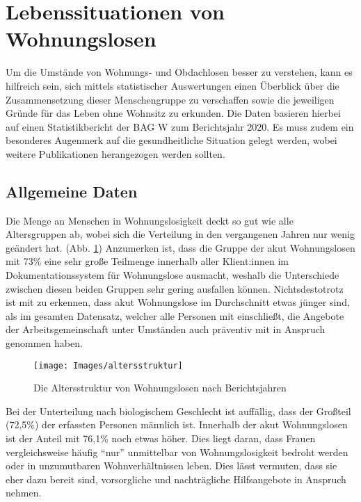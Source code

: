\section{Lebenssituationen von Wohnungslosen}\label{sec:situation}

Um die Umstände von Wohnungs- und Obdachlosen besser zu verstehen, kann es hilfreich sein, sich mittels statistischer Auswertungen einen Überblick über die Zusammensetzung dieser Menschengruppe zu verschaffen sowie die jeweiligen Gründe für das Leben ohne Wohnsitz zu erkunden. Die Daten basieren hierbei auf einen Statistikbericht der \ac{BAG W} zum Berichtsjahr 2020. Es muss zudem ein besonderes Augenmerk auf die gesundheitliche Situation gelegt werden, wobei weitere Publikationen herangezogen werden sollten.

\subsection{Allgemeine Daten}

Die Menge an Menschen in Wohnungslosigkeit deckt so gut wie alle Altersgruppen ab, wobei sich die Verteilung in den vergangenen Jahren nur wenig geändert hat. (Abb. \ref{fig:altersstruktur}) Anzumerken ist, dass die Gruppe der akut Wohnungslosen mit 73\% eine sehr große Teilmenge innerhalb aller Klient:innen im Dokumentationssystem für Wohnungslose ausmacht, weshalb die Unterschiede zwischen diesen beiden Gruppen sehr gering ausfallen können. Nichtsdestotrotz ist mit zu erkennen, dass akut Wohnungslose im Durchschnitt etwas jünger sind, als im gesamten Datensatz, welcher alle Personen mit einschließt, die Angebote der Arbeitsgemeinschaft unter Umständen auch präventiv mit in Anspruch genommen haben.

\begin{figure}[h]
	\centering
	\texttt{[image: Images/altersstruktur]}
	\caption[Altersstruktur von Wohnungslosen]{Die Altersstruktur von Wohnungslosen nach Berichtsjahren \citep[S. 8]{BAGW.2022}}
	\label{fig:altersstruktur}
\end{figure}

Bei der Unterteilung nach biologischem Geschlecht ist auffällig, dass der Großteil (72,5\%) der erfassten Personen männlich ist. Innerhalb der akut Wohnungslosen ist der Anteil mit 76,1\% noch etwas höher. Dies liegt daran, dass Frauen vergleichsweise häufig \enquote{nur} unmittelbar von Wohnungslosigkeit bedroht werden oder in unzumutbaren Wohnverhältnissen leben. Dies lässt vermuten, dass sie eher dazu bereit sind, vorsorgliche und nachträgliche Hilfsangebote in Anspruch nehmen.

